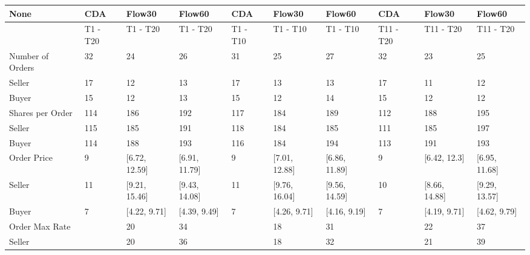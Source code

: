 \begin{tabular}{llllllllll}
\hline
 None                   & CDA      & Flow30        & Flow60        & CDA      & Flow30        & Flow60        & CDA       & Flow30        & Flow60        \\
\hline
                        & T1 - T20 & T1 - T20      & T1 - T20      & T1 - T10 & T1 - T10      & T1 - T10      & T11 - T20 & T11 - T20     & T11 - T20     \\
 Number of Orders       & 32       & 24            & 26            & 31       & 25            & 27            & 32        & 23            & 25            \\
 Seller                 & 17       & 12            & 13            & 17       & 13            & 13            & 17        & 11            & 12            \\
 Buyer                  & 15       & 12            & 13            & 15       & 12            & 14            & 15        & 12            & 12            \\
 Shares per Order       & 114      & 186           & 192           & 117      & 184           & 189           & 112       & 188           & 195           \\
 Seller                 & 115      & 185           & 191           & 118      & 184           & 185           & 111       & 185           & 197           \\
 Buyer                  & 114      & 188           & 193           & 116      & 184           & 194           & 113       & 191           & 193           \\
 Order Price            & 9        & [6.72, 12.59] & [6.91, 11.79] & 9        & [7.01, 12.88] & [6.86, 11.89] & 9         & [6.42, 12.3]  & [6.95, 11.68] \\
 Seller                 & 11       & [9.21, 15.46] & [9.43, 14.08] & 11       & [9.76, 16.04] & [9.56, 14.59] & 10        & [8.66, 14.88] & [9.29, 13.57] \\
 Buyer                  & 7        & [4.22, 9.71]  & [4.39, 9.49]  & 7        & [4.26, 9.71]  & [4.16, 9.19]  & 7         & [4.19, 9.71]  & [4.62, 9.79]  \\
 Order Max Rate         &          & 20            & 34            &          & 18            & 31            &           & 22            & 37            \\
 Seller                 &          & 20            & 36            &          & 18            & 32            &           & 21            & 39            \\

\end{tabular}
